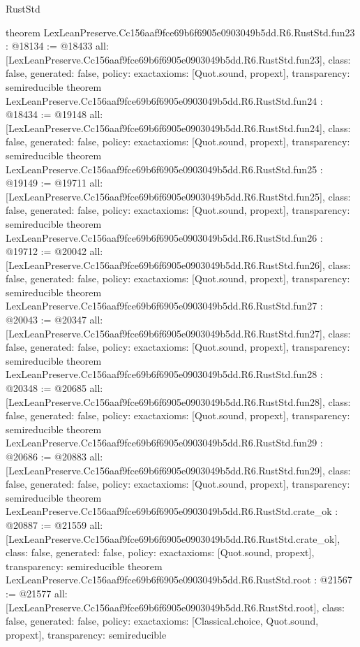 \begin{lexlean}{RustStd}
\begin{coremodule}
{}
theorem LexLeanPreserve.Cc156aaf9fce69b6f6905e0903049b5dd.R6.RustStd.fun23 : @18134 := @18433 {
  all: [LexLeanPreserve.Cc156aaf9fce69b6f6905e0903049b5dd.R6.RustStd.fun23],
  class: false,
  generated: false,
  policy: exact{axioms: [Quot.sound, propext]},
  transparency: semireducible
}
theorem LexLeanPreserve.Cc156aaf9fce69b6f6905e0903049b5dd.R6.RustStd.fun24 : @18434 := @19148 {
  all: [LexLeanPreserve.Cc156aaf9fce69b6f6905e0903049b5dd.R6.RustStd.fun24],
  class: false,
  generated: false,
  policy: exact{axioms: [Quot.sound, propext]},
  transparency: semireducible
}
theorem LexLeanPreserve.Cc156aaf9fce69b6f6905e0903049b5dd.R6.RustStd.fun25 : @19149 := @19711 {
  all: [LexLeanPreserve.Cc156aaf9fce69b6f6905e0903049b5dd.R6.RustStd.fun25],
  class: false,
  generated: false,
  policy: exact{axioms: [Quot.sound, propext]},
  transparency: semireducible
}
theorem LexLeanPreserve.Cc156aaf9fce69b6f6905e0903049b5dd.R6.RustStd.fun26 : @19712 := @20042 {
  all: [LexLeanPreserve.Cc156aaf9fce69b6f6905e0903049b5dd.R6.RustStd.fun26],
  class: false,
  generated: false,
  policy: exact{axioms: [Quot.sound, propext]},
  transparency: semireducible
}
theorem LexLeanPreserve.Cc156aaf9fce69b6f6905e0903049b5dd.R6.RustStd.fun27 : @20043 := @20347 {
  all: [LexLeanPreserve.Cc156aaf9fce69b6f6905e0903049b5dd.R6.RustStd.fun27],
  class: false,
  generated: false,
  policy: exact{axioms: [Quot.sound, propext]},
  transparency: semireducible
}
theorem LexLeanPreserve.Cc156aaf9fce69b6f6905e0903049b5dd.R6.RustStd.fun28 : @20348 := @20685 {
  all: [LexLeanPreserve.Cc156aaf9fce69b6f6905e0903049b5dd.R6.RustStd.fun28],
  class: false,
  generated: false,
  policy: exact{axioms: [Quot.sound, propext]},
  transparency: semireducible
}
theorem LexLeanPreserve.Cc156aaf9fce69b6f6905e0903049b5dd.R6.RustStd.fun29 : @20686 := @20883 {
  all: [LexLeanPreserve.Cc156aaf9fce69b6f6905e0903049b5dd.R6.RustStd.fun29],
  class: false,
  generated: false,
  policy: exact{axioms: [Quot.sound, propext]},
  transparency: semireducible
}
theorem LexLeanPreserve.Cc156aaf9fce69b6f6905e0903049b5dd.R6.RustStd.crate_ok : @20887 := @21559 {
  all: [LexLeanPreserve.Cc156aaf9fce69b6f6905e0903049b5dd.R6.RustStd.crate_ok],
  class: false,
  generated: false,
  policy: exact{axioms: [Quot.sound, propext]},
  transparency: semireducible
}
theorem LexLeanPreserve.Cc156aaf9fce69b6f6905e0903049b5dd.R6.RustStd.root : @21567 := @21577 {
  all: [LexLeanPreserve.Cc156aaf9fce69b6f6905e0903049b5dd.R6.RustStd.root],
  class: false,
  generated: false,
  policy: exact{axioms: [Classical.choice, Quot.sound, propext]},
  transparency: semireducible
}


\end{coremodule}
\end{lexlean}
